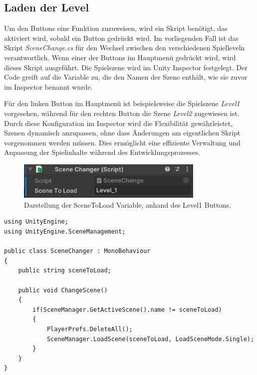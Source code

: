 \subsection{Laden der Level}
Um den Buttons eine Funktion zuzuweisen, wird ein Skript benötigt, das aktiviert wird, sobald ein Button gedrückt wird.
Im vorliegenden Fall ist das Skript \textit{SceneChange.cs} für den Wechsel zwischen den verschiedenen Spielleveln verantwortlich.
Wenn einer der Buttons im Hauptmenü gedrückt wird, wird dieses Skript ausgeführt. Die Spielszene wird im Unity Inspector
festgelegt. Der Code greift auf die Variable zu, die den Namen der Szene enthält, wie sie zuvor im Inspector benannt wurde.

Für den linken Button im Hauptmenü ist beispielsweise die Spielszene \textit{Level1} vorgesehen, während für den rechten
Button die Szene \textit{Level2} zugewiesen ist. Durch diese Konfiguration im Inspector wird die Flexibilität gewährleistet,
Szenen dynamisch anzupassen, ohne dass Änderungen am eigentlichen Skript vorgenommen werden müssen. Dies ermöglicht eine
effiziente Verwaltung und Anpassung der Spielinhalte während des Entwicklungsprozesses.

\begin{figure}[H]
    \centering
    \includegraphics[width=0.8\textwidth]{images/sceneToLoad.png}
    \caption{Darstellung der SceneToLoad Variable, anhand des Level1 Buttons.}
    \label{fig:scenetoload}
\end{figure}

\begin{lstlisting}[style=csharp, caption=Auf Knopfdruck Szene wechseln., label=code:scenechange]
using UnityEngine;
using UnityEngine.SceneManagement;

public class SceneChanger : MonoBehaviour
{
    public string sceneToLoad;

    public void ChangeScene()
    {
        if(SceneManager.GetActiveScene().name != sceneToLoad)
        {
            PlayerPrefs.DeleteAll();
            SceneManager.LoadScene(sceneToLoad, LoadSceneMode.Single);
        }
    }
}
\end{lstlisting}

